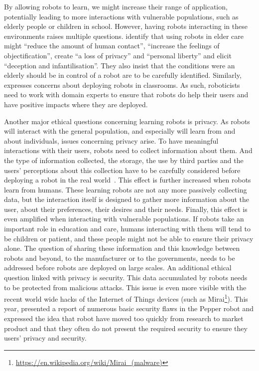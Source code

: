 By allowing robots to learn, we might increase their range of application, potentially leading to more interactions with vulnerable populations, such as elderly people or children in school. However, having robots interacting in these environments raises multiple questions. \cite{sharkey2012granny} identify that using robots in elder care might ``reduce the amount of human contact'', ``increase the feelings of objectification'', create ``a loss of privacy'' and ``personal liberty'' and elicit ``deception and infantilisation''. They also insist that the conditions were an elderly should be in control of a robot are to be carefully identified. Similarly, \cite{sharkey2016should} expresses concerns about deploying robots in classrooms. As such, roboticists need to work with domain experts to ensure that robots do help their users and have positive impacts where they are deployed.

Another major ethical questions concerning learning robots is privacy. As robots will interact with the general population, and especially will learn from and about individuals, issues concerning privacy arise. To have meaningful interactions with their users, robots need to collect information about them. And the type of information collected, the storage, the use by third parties and the users' perceptions about this collection have to be carefully considered before deploying a robot in the real world~\citep{syrdal2007he}. This effect is further increased when robots learn from humans. These learning robots are not any more passively collecting data, but the interaction itself is designed to gather more information about the user, about their preferences, their desires and their needs. Finally, this effect is even amplified when interacting with vulnerable populations. If robots take an important role in education and care, humans interacting with them will tend to be children or patient, and these people might not be able to ensure their privacy alone. The question of sharing these information and this knowledge between robots and beyond, to the manufacturer or to the governments, needs to be addressed before robots are deployed on large scales. An additional ethical question linked with privacy is security. This data accumulated by robots needs to be protected from malicious attacks. This issue is even more visible with the recent world wide hacks of the Internet of Things devices (such as Mirai\footnote{\url{https://en.wikipedia.org/wiki/Mirai_(malware)}}). This year, \cite{giaretta2018adding} presented a report of numerous basic security flaws in the Pepper robot and expressed the idea that robot have moved too quickly from research to market product and that they often do not present the required security to ensure they users' privacy and security.

